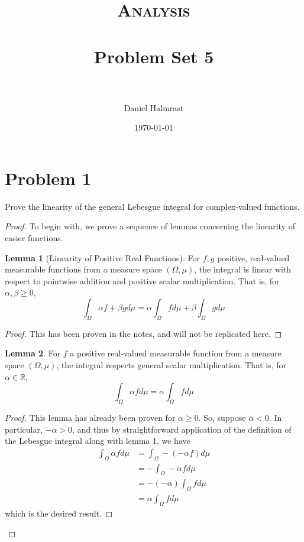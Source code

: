 \documentclass[fontsize=11pt]{scrartcl} %
\title{	
\normalfont \normalsize 
\textsc{Analysis} \\ [25pt] %
\horrule{0.5pt} \\[0.4cm] %
\huge Problem Set 5\\ %
\horrule{2pt} \\[0.5cm] %
}
\author{Daniel Halmrast} %
\date{\normalsize\today} %
\numberwithin{equation}{section} %
\numberwithin{figure}{section} %
\numberwithin{table}{section} %
\newcommand{\R}{\mathbb{R}}
\theoremstyle{definition}
\newtheorem{lemma}{Lemma}
\begin{document}
\maketitle %

\section*{Problem 1}
Prove the linearity of the general Lebesgue integral for complex-valued functions.
\\
\begin{proof}
To begin with, we prove a sequence of lemmas concerning the linearity of easier functions.
\begin{lemma}[Linearity of Positive Real Functions]
For $f,g$ positive, real-valued measurable functions from a measure space $(\Omega,\mu)$,
the integral is linear with respect to pointwise addition and positive scalar
multiplication. That is, for $\alpha, \beta \geq 0$,
\[
\int_{\Omega} \alpha f + \beta g d\mu = \alpha\int_{\Omega} fd\mu + \beta\int_{\Omega} gd\mu
\]
\end{lemma}
\begin{proof}
This has been proven in the notes, and will not be replicated here.
\end{proof}

\begin{lemma}
For $f$ a positive real-valued measurable function from a measure space $(\Omega,\mu)$,
the integral respects general scalar multiplication. That is, for $\alpha\in\R$, 
\[
\int_{\Omega}\alpha fd\mu = \alpha\int_{\Omega} fd\mu
\]
\end{lemma}
\begin{proof}
This lemma has already been proven for $\alpha\geq 0$. So, suppose $\alpha < 0$.
In particular, $-\alpha > 0$, and thus by straightforward application of the definition of
the Lebesgue integral along with lemma 1, we have
\[
\begin{aligned}
\int_{\Omega}\alpha fd\mu   &= \int_{\Omega}-(-\alpha f)d\mu\\
                            &= -\int_{\Omega}-\alpha fd\mu\\
                            &= -(-\alpha)\int_{\Omega} fd\mu\\
                            &= \alpha\int_{\Omega} fd\mu
\end{aligned}
\]
which is the desired result.
\end{proof}


\end{proof}
\end{document}
